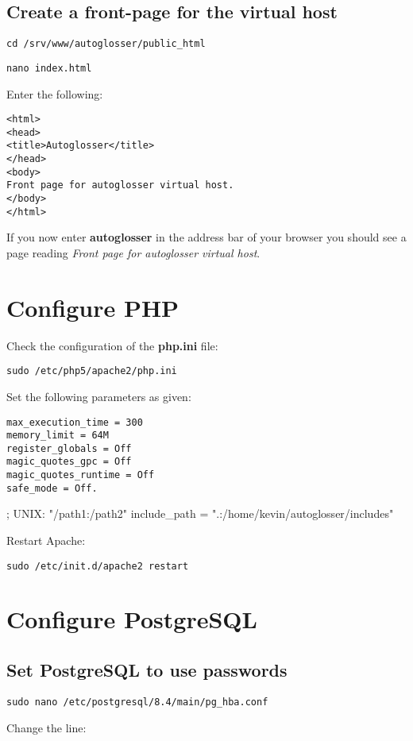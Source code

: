 \documentclass[a4paper,10pt]{article}
\begin{document}
\subsection{Create a front-page for the virtual host}
\label{subsec:create-front-page}

\texttt{cd /srv/www/autoglosser/public\_html}

\texttt{nano index.html}

Enter the following:

\begin{verbatim}
<html>
<head>
<title>Autoglosser</title>
</head>
<body>
Front page for autoglosser virtual host.
</body>
</html>
\end{verbatim}

If you now enter \textbf{autoglosser} in the address bar of your browser you should see a page reading \textit{Front page for autoglosser virtual host}.

\section{Configure PHP}

Check the configuration of the \textbf{php.ini} file:

\texttt{sudo /etc/php5/apache2/php.ini}

Set the following parameters as given:

\begin{verbatim}
max_execution_time = 300
memory_limit = 64M
register_globals = Off
magic_quotes_gpc = Off
magic_quotes_runtime = Off
safe_mode = Off.
\end{verbatim}

; UNIX: "/path1:/path2"
include\_path = ".:/home/kevin/autoglosser/includes"


Restart Apache:

\texttt{sudo /etc/init.d/apache2 restart}

\section{Configure PostgreSQL}

\subsection{Set PostgreSQL to use passwords}

\texttt{sudo nano /etc/postgresql/8.4/main/pg\_hba.conf}

Change the line:
\end{document}

